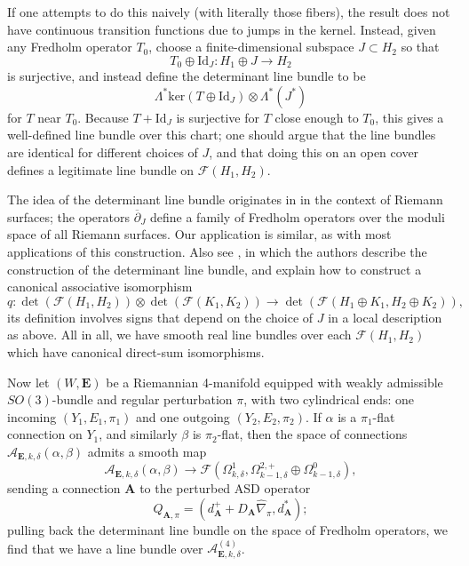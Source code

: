 \documentclass[10pt,a4paper]{amsart}
\theoremstyle{definition}
\theoremstyle{remark}
\numberwithin{figure}{qchap}
\begin{document}
If one attempts to do this naively (with literally those fibers), the result does not have continuous transition functions due to jumps in the kernel. Instead, given any Fredholm operator $T_0$, choose a finite-dimensional subspace $J \subset H_2$ so that 
$$T_0 \oplus \text{Id}_J: H_1 \oplus J \to H_2$$ 
is surjective, and instead define the determinant line bundle to be 
$$\Lambda^* \text{ker}(T \oplus \text{Id}_J) \otimes \Lambda^*(J^*)$$ 
for $T$ near $T_0$. Because $T + \text{Id}_J$ is surjective for $T$ close enough to $T_0$, this gives a well-defined line bundle over this chart; one should argue that the line bundles are identical for different choices of $J$, and that doing this on an open cover defines a legitimate line bundle on $\mathcal F(H_1, H_2)$.

The idea of the determinant line bundle originates in \cite{quillen} in the context of Riemann surfaces; the operators $\overline \partial_J$ define a family of Fredholm operators over the moduli space of all Riemann surfaces. Our application is similar, as with most applications of this construction. Also see \cite[Section~20.2]{KMSW}, in which the authors describe the construction of the determinant line bundle, and explain how to construct a canonical associative isomorphism $$q: \det(\mathcal F(H_1, H_2)) \otimes \det(\mathcal F(K_1, K_2)) \to \det(\mathcal F(H_1 \oplus K_1, H_2 \oplus K_2)),$$ its definition involves signs that depend on the choice of $J$ in a local description as above. All in all, we have smooth real line bundles over each $\mathcal F(H_1, H_2)$ which have canonical direct-sum isomorphisms.

Now let $(W,\mathbf{E})$ be a Riemannian 4-manifold equipped with weakly admissible $SO(3)$-bundle and regular perturbation $\pi$, with two cylindrical ends: one incoming $(Y_1, E_1,\pi_1)$ and one outgoing $(Y_2, E_2,\pi_2)$. If $\alpha$ is a $\pi_1$-flat connection on $Y_1$, and similarly $\beta$ is $\pi_2$-flat, then the space of connections $\mathcal A_{\mathbf{E}, k, \delta}(\alpha, \beta)$ admits a smooth map $$\mathcal A_{\mathbf{E}, k, \delta}(\alpha, \beta) \to \mathcal F\left(\Omega^1_{k,\delta}, \Omega^{2,+}_{k-1,\delta} \oplus \Omega^0_{k-1,\delta}\right),$$ sending a connection $\mathbf{A}$ to the perturbed ASD operator $$Q_{\mathbf{A},\pi} = (d^+_{\mathbf{A}} + D_{\mathbf{A}} \widehat{\nabla}_\pi, d^*_{\mathbf{A}});$$ pulling back the determinant line bundle on the space of Fredholm operators, we find that we have a line bundle over $\mathcal A^{(4)}_{\mathbf{E}, k, \delta}$. 
\end{document}
